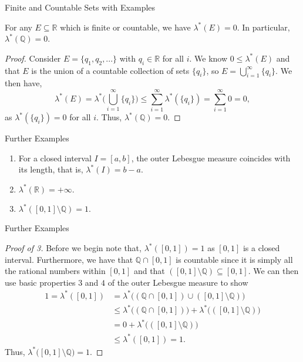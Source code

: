 \documentclass{beamer}
\begin{document}
\begin{frame}{Finite and Countable Sets with Examples}
\begin{example}
For any $E\subseteq\mathbb{R}$ which is finite or countable, we have $\lambda^{*}(E)=0$. In particular, $\lambda^{*}(\mathbb{Q})=0$.
\end{example}
\begin{proof}
Consider $E=\{q_{1},q_{2},...\}$ with $q_{i}\in\mathbb{R}$ for all $i$. We know $0\leq\lambda^{*}(E)$ and that $E$ is the union of a countable collection of sets $\{q_{i}\}$, so $E=\bigcup_{i=1}^{\infty}\{q_{i}\}$. We then have,
$$\lambda^{*}(E)=\lambda^{*}\big(\bigcup_{i=1}^{\infty}\{q_{i}\}\big)
\leq\sum_{i=1}^{\infty}\lambda^{*}(\{q_{i}\})=\sum_{i=1}^{\infty}0=0,$$
as $\lambda^{*}(\{q_{i}\})=0$ for all $i$. Thus, $\lambda^{*}(\mathbb{Q})=0$.
\end{proof}
\end{frame}

\begin{frame}{Further Examples}
\begin{Examples}
\begin{enumerate}
    \item For a closed interval $I=[a,b]$, the outer Lebesgue measure coincides with its length, that is, $\lambda^{*}(I)=b-a$.
    \item $\lambda^{*}(\mathbb{R})=+\infty$.
    \item $\lambda^{*}([0,1]\setminus\mathbb{Q})=1.$
\end{enumerate}
\end{Examples}

\end{frame}

\begin{frame}{Further Examples}
\begin{proof}[Proof of 3]
Before we begin note that, $\lambda^{*}([0,1])=1$ as $[0,1]$ is a closed interval. Furthermore, we have that $\mathbb{Q}\cap[0,1]$ is countable since it is simply all the rational numbers within $[0,1]$ and that $([0,1]\setminus\mathbb{Q})\subseteq[0,1]$. We can then use basic properties $3$ and $4$ of the outer Lebesgue measure to show
\begin{align*}
 1= \lambda^{*}([0,1])&=\lambda^{*}\big((\mathbb{Q}\cap[0,1])\cup([0,1]\setminus\mathbb{Q})\big)
 \\& \leq \lambda^{*}\big((\mathbb{Q}\cap[0,1])\big) + \lambda^{*}\big(([0,1]\setminus\mathbb{Q})\big) 
 \\& = 0 + \lambda^{*}\big(([0,1]\setminus\mathbb{Q})\big)
 \\& \leq \lambda^{*}([0,1]) = 1.
\end{align*}
Thus, $\lambda^{*}\big([0,1]\setminus\mathbb{Q}\big)=1$.
\end{proof}
\end{frame}
\end{document}
